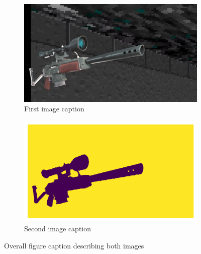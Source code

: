 \begin{figure}[htbp]
    \centering
    \begin{subfigure}{0.48\textwidth}
        \centering
        \includegraphics[width=\textwidth]{ressources/00009.jpg}
        \caption{First image caption}
        \label{fig:first-image}
    \end{subfigure}
    \hfill
    \begin{subfigure}{0.48\textwidth}
        \centering
        \includegraphics[width=\textwidth]{ressources/depth_map.png}
        \caption{Second image caption}
        \label{fig:second-image}
    \end{subfigure}
    \caption{Overall figure caption describing both images}
    \label{fig:double-image}
\end{figure}
